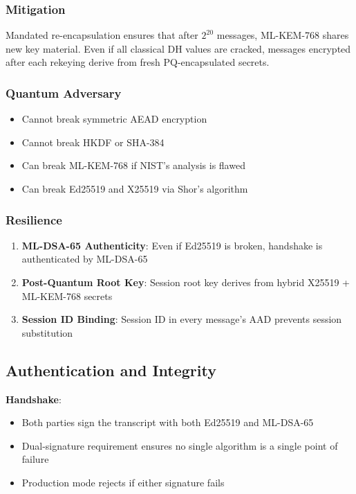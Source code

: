 \documentclass[11pt,a4paper,oneside]{article}
\begin{document}
\subsubsection{Mitigation}
Mandated re-encapsulation ensures that after $2^{20}$ messages, ML-KEM-768 shares new key material. Even if all classical DH values are cracked, messages encrypted after each rekeying derive from fresh PQ-encapsulated secrets.

\subsubsection{Quantum Adversary}
\begin{itemize}
\item Cannot break symmetric AEAD encryption
\item Cannot break HKDF or SHA-384
\item Can break ML-KEM-768 if NIST's analysis is flawed
\item Can break Ed25519 and X25519 via Shor's algorithm
\end{itemize}

\subsubsection{Resilience}
\begin{enumerate}
\item \textbf{ML-DSA-65 Authenticity}: Even if Ed25519 is broken, handshake is authenticated by ML-DSA-65
\item \textbf{Post-Quantum Root Key}: Session root key derives from hybrid X25519 + ML-KEM-768 secrets
\item \textbf{Session ID Binding}: Session ID in every message's AAD prevents session substitution
\end{enumerate}

\subsection{Authentication and Integrity}

\textbf{Handshake}:
\begin{itemize}
\item Both parties sign the transcript with both Ed25519 and ML-DSA-65
\item Dual-signature requirement ensures no single algorithm is a single point of failure
\item Production mode rejects if either signature fails
\end{itemize}
\end{document}
